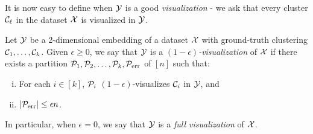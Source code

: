 


It is now easy to define when $\mathcal{Y}$ is a good \emph{visualization} - we ask that every cluster $\mathcal{C}_\ell$ in the dataset $\mathcal{X}$ is visualized in $\mathcal{Y}$.

\begin{defn}[Visualization] \label{def:visualization-full}
	Let $\mathcal{Y}$ be a 2-dimensional embedding of a dataset $\mathcal{X}$ with ground-truth clustering $\mathcal{C}_1, \ldots, \mathcal{C}_k$. %
	Given $\epsilon\ge0$,
	we say that $\mathcal{Y}$ is a \emph{$(1-\epsilon)$-visualization} of $\mathcal{X}$
	 if 
	there exists a partition $\mathcal{P}_1, \mathcal{P}_2, \ldots, \mathcal{P}_k, \mathcal{P}_{\mathrm{err}}$ of $ [n]$ such that:
	\begin{enumerate}[(i)]
		\item For each $i \in [k]$, $\mathcal{P}_{i}$ $(1-\epsilon)$-visualizes $\mathcal{C}_i$ in $\mathcal{Y}$, and
		\item %
		 $|\mathcal{P}_{\mathrm{err}}| \le \epsilon n$.
	\end{enumerate}
In particular, when $\epsilon = 0$, we say that $\mathcal{Y}$ is a \emph{full visualization} of $\mathcal{X}$.
\end{defn}


